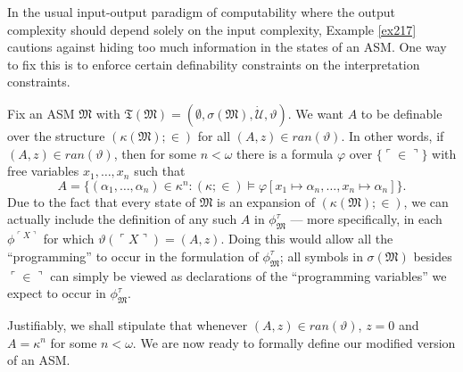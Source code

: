 \documentclass[12pt]{article}
\numberwithin{equation}{section}
\begin{document}
In the usual input-output paradigm of computability where the output complexity should depend solely on the input complexity, Example \ref{ex217} cautions against hiding too much information in the states of an ASM. One way to fix this is to enforce certain definability constraints on the interpretation constraints. 

Fix an ASM $\mathfrak{M}$ with $\mathfrak{T}(\mathfrak{M}) = (\emptyset, \sigma(\mathfrak{M}), \dot{\mathcal{U}}, \vartheta)$. We want $A$ to be definable over the structure $(\kappa(\mathfrak{M}); \in)$ for all $(A, z) \in ran(\vartheta)$. In other words, if $(A, z) \in ran(\vartheta)$, then for some $n < \omega$ there is a formula $\varphi$ over $\{\ulcorner \in \urcorner\}$ with free variables $x_1, \dots, x_n$ such that 
\begin{equation*}
    A = \{(\alpha_1, \dots, \alpha_n) \in \kappa^n : (\kappa; \in) \models \varphi[x_1 \mapsto \alpha_n, \dots, x_n \mapsto \alpha_n]\} \text{.}
\end{equation*}
Due to the fact that every state of $\mathfrak{M}$ is an expansion of $(\kappa(\mathfrak{M}); \in)$, we can actually include the definition of any such $A$ in $\phi^{\tau}_{\mathfrak{M}}$ --- more specifically, in each $\phi^{\ulcorner X \urcorner}$ for which $\vartheta(\ulcorner X \urcorner) = (A, z)$. Doing this would allow all the ``programming'' to occur in the formulation of $\phi^{\tau}_{\mathfrak{M}}$; all symbols in $\sigma(\mathfrak{M})$ besides $\ulcorner \in \urcorner$ can simply be viewed as declarations of the ``programming variables'' we expect to occur in $\phi^{\tau}_{\mathfrak{M}}$. 

Justifiably, we shall stipulate that whenever $(A, z) \in ran(\vartheta)$, $z = 0$ and $A = \kappa^n$ for some $n < \omega$. We are now ready to formally define our modified version of an ASM.
\end{document}
